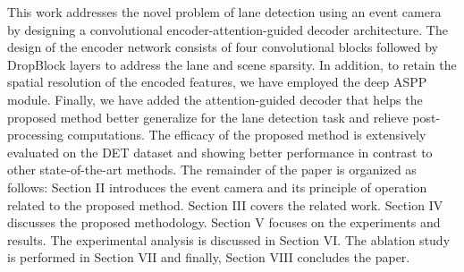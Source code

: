 \documentclass[journal]{IEEEtran}
\begin{document}
 This work addresses the novel problem of lane detection using an event camera by designing a convolutional encoder-attention-guided decoder architecture. The design of the encoder network consists of four convolutional blocks followed by DropBlock layers to address the lane and scene sparsity. In addition, to retain the spatial resolution of the encoded features, we have employed the deep ASPP module. Finally, we have added the attention-guided decoder that helps the proposed method better generalize for the lane detection task and relieve post-processing computations. The efficacy of the proposed method is extensively evaluated on the DET dataset and showing better performance in contrast to other state-of-the-art methods. The remainder of the paper is organized as follows: Section II introduces the event camera and its principle of operation related to the proposed method. Section III covers the related work. Section IV discusses the proposed methodology. Section V focuses on the experiments and results. The experimental analysis is discussed in Section VI. The ablation study is performed in Section VII and finally, Section VIII concludes the paper.
\end{document}
